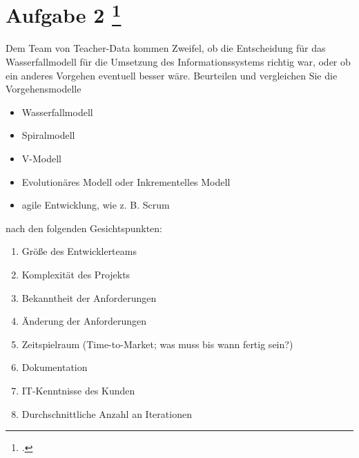 \documentclass{lehramt-informatik}
\begin{document}
%

\section{Aufgabe 2
\footcite[Seite 2]{sosy:ab:1}}

Dem Team von Teacher-Data kommen Zweifel, ob die Entscheidung für das
Wasserfallmodell für die Umsetzung des Informationssystems richtig war,
oder ob ein anderes Vorgehen eventuell besser wäre. Beurteilen und
vergleichen Sie die Vorgehensmodelle

\begin{itemize}
\item Wasserfallmodell
\item Spiralmodell
\item V-Modell
\item Evolutionäres Modell oder Inkrementelles Modell
\item agile Entwicklung, wie z. B. Scrum
\end{itemize}

\noindent
nach den folgenden Gesichtspunkten:

\begin{enumerate}
\item Größe des Entwicklerteams
\item Komplexität des Projekts
\item Bekanntheit der Anforderungen
\item Änderung der Anforderungen
\item Zeitspielraum (Time-to-Market; was muss bis wann fertig sein?)
\item Dokumentation
\item IT-Kenntnisse des Kunden
\item Durchschnittliche Anzahl an Iterationen
\end{enumerate}
\end{document}

